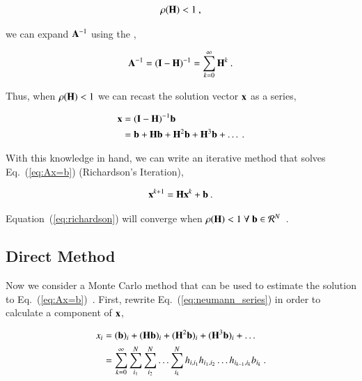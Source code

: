 \documentclass[preprint,12pt]{elsarticle}
\newcommand{\vA}{\ensuremath{\ve{A}}}
\newcommand{\vb}{\ensuremath{\ve{b}}}
\newcommand{\vx}{\ensuremath{\ve{x}}}
\newcommand{\vI}{\ensuremath{\ve{I}}}
\newcommand{\vH}{\ensuremath{\ve{H}}}
\begin{document}
\begin{equation}
  \rho(\vH) < 1\:,
\end{equation}

we can expand $\vA^{-1}$ using the ,

\begin{equation}
  \vA^{-1} = (\vI - \vH)^{-1} =  \sum_{k=0}^{\infty} \vH^k\:.
\end{equation} 

Thus, when $\rho(\vH) < 1$ we can recast the solution vector $\vx$ as
a series,

\begin{equation}
  \begin{split}
    \vx &= (\vI - \vH)^{-1}\vb\\
    &= \vb + \vH\vb + \vH^2\vb + \vH^3\vb + \ldots\:.
    \label{eq:neumann_series}
  \end{split}
\end{equation}

With this knowledge in hand, we can write an iterative method that
solves Eq.~(\ref{eq:Ax=b}) (Richardson's Iteration),

\begin{equation}
  \vx^{k+1} = \vH\vx^k + \vb\:.
  \label{eq:richardson}
\end{equation}

Equation~(\ref{eq:richardson}) will converge when $\rho(\vH) < 1\ 
\forall\ \vb \in \mathcal{R}^{N}$~\cite{kelley_1995}.

\subsection{Direct Method}
\label{sec:direct-method}

Now we consider a Monte Carlo method that can be used to estimate the
solution to Eq.~(\ref{eq:Ax=b})~\cite{hammersley_1964}.  First,
rewrite Eq.~(\ref{eq:neumann_series}) in order to calculate a
component of $\vx$,

\begin{equation}
  \begin{split}
    x_i &= (\vb)_i + (\vH\vb)_i + (\vH^2\vb)_i + (\vH^3\vb)_i +
    \ldots\\
    &= \sum_{k=0}^{\infty}\sum_{i_1}^{N}\sum_{i_2}^{N}\ldots
    \sum_{i_k}^{N}h_{i,i_1}h_{i_1,i_2}\ldots h_{i_{k-1},i_k}b_{i_k}\:.
  \end{split}
  \label{eq:neumann_series_i}
\end{equation}
\end{document}
